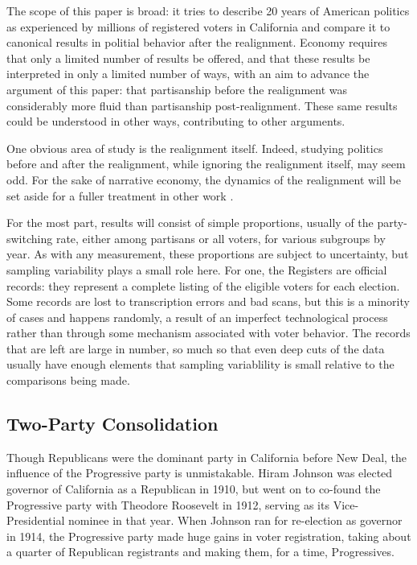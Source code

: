 \documentclass[11pt]{scrartcl}\usepackage[]{graphicx}\usepackage[]{color}
\begin{document}
The scope of this paper is broad: it tries to describe 20 years of American politics as experienced by millions of registered voters in California and compare it to canonical results in politial behavior after the realignment. Economy requires that only a limited number of results be offered, and that these results be interpreted in only a limited number of ways, with an aim to advance the argument of this paper: that partisanship before the realignment was considerably more fluid than partisanship post-realignment. These same results could be understood in other ways, contributing to other arguments. 



One obvious area of study is the realignment itself.  Indeed, studying politics before and after the realignment, while ignoring the realignment itself, may seem odd. For the sake of narrative economy, the dynamics of the realignment will be set aside for a fuller treatment in other work \citep{spahn2018before}.

For the most part, results will consist of simple proportions, usually of the party-switching rate, either among partisans or all voters, for various subgroups by year. As with any measurement, these proportions are subject to uncertainty, but sampling variability plays a small role here. For one, the Registers are official records: they represent a complete listing of the eligible voters for each election. Some records are lost to transcription errors and bad scans, but this is a minority of cases and happens randomly, a result of an imperfect technological process rather than through some mechanism associated with voter behavior. The records that are left are large in number, so much so that even deep cuts of the data usually have enough elements that sampling variablility is small relative to the comparisons being made. 







\subsection*{Two-Party Consolidation}

Though Republicans were the dominant party in California before New Deal, the influence of the Progressive party is unmistakable. Hiram Johnson was elected governor of California as a Republican in 1910, but went on to co-found the Progressive party with Theodore Roosevelt in 1912, serving as its Vice-Presidential nominee in that year.  When Johnson ran for re-election as governor in 1914, the Progressive party made huge gains in voter registration, taking about a quarter of Republican registrants and making them, for a time, Progressives.
\end{document}
